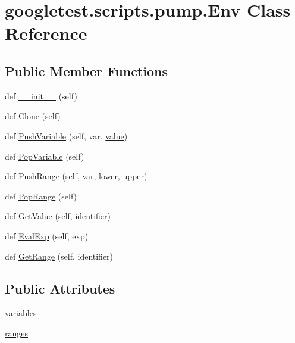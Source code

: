 \hypertarget{classgoogletest_1_1scripts_1_1pump_1_1_env}{}\section{googletest.\+scripts.\+pump.\+Env Class Reference}
\label{classgoogletest_1_1scripts_1_1pump_1_1_env}
\subsection*{Public Member Functions}
\begin{DoxyCompactItemize}
\item 
def \mbox{\hyperlink{classgoogletest_1_1scripts_1_1pump_1_1_env_a74e24cd6b71e505ff689a5060d8a510e}{\+\_\+\+\_\+init\+\_\+\+\_\+}} (self)
\item 
def \mbox{\hyperlink{classgoogletest_1_1scripts_1_1pump_1_1_env_a4d2d9b7b58705e6aa861140bf00fe8c9}{Clone}} (self)
\item 
def \mbox{\hyperlink{classgoogletest_1_1scripts_1_1pump_1_1_env_a56e1e096164dac194253f730327e9ce7}{Push\+Variable}} (self, var, \mbox{\hyperlink{_obj__test_2lib_2googletest-master_2googlemock_2test_2gmock-matchers__test_8cc_a337b8a670efc0b086ad3af163f3121b6}{value}})
\item 
def \mbox{\hyperlink{classgoogletest_1_1scripts_1_1pump_1_1_env_a909b778c2ab0844769f7743592f32910}{Pop\+Variable}} (self)
\item 
def \mbox{\hyperlink{classgoogletest_1_1scripts_1_1pump_1_1_env_a3556dc62e3d617a34b0e424274bfc32e}{Push\+Range}} (self, var, lower, upper)
\item 
def \mbox{\hyperlink{classgoogletest_1_1scripts_1_1pump_1_1_env_a18744267318d3f0d537521cf1af35cfa}{Pop\+Range}} (self)
\item 
def \mbox{\hyperlink{classgoogletest_1_1scripts_1_1pump_1_1_env_a7a283e219a2b5c4fce9459bcfdf9d18f}{Get\+Value}} (self, identifier)
\item 
def \mbox{\hyperlink{classgoogletest_1_1scripts_1_1pump_1_1_env_aa958847e2726826399fc833de033a8fd}{Eval\+Exp}} (self, exp)
\item 
def \mbox{\hyperlink{classgoogletest_1_1scripts_1_1pump_1_1_env_a18d2ba7d3135b5ea55427197d3802f5a}{Get\+Range}} (self, identifier)
\end{DoxyCompactItemize}
\subsection*{Public Attributes}
\begin{DoxyCompactItemize}
\item 
\mbox{\hyperlink{classgoogletest_1_1scripts_1_1pump_1_1_env_ad7ded662887fcb7e96f0f153f67aa810}{variables}}
\item 
\mbox{\hyperlink{classgoogletest_1_1scripts_1_1pump_1_1_env_aabe0a82292dbf0b1e6619c0f30d11cc3}{ranges}}
\end{DoxyCompactItemize}


